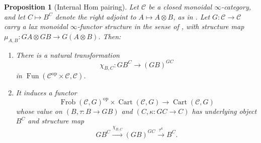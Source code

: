 \documentclass[10pt,a4paper]{amsart}
\newtheorem{proposition}{Proposition}
\newcommand{\Cart}{\operatorname{Cart}}
\newcommand{\Frob}{\operatorname{Frob}}
\DeclareMathOperator{\Fun}{\mathrm{Fun}}
\newcommand{\cC}{\mathcal{C}}
\newcommand{\op}{{\operatorname{op}}}
\begin{document}
\begin{proposition}[Internal Hom pairing]\label{prop:abstract-hom}
Let $\cC$ be a closed monoidal $\infty$-category, and let
$C\mapsto B^C$ denote the right adjoint to $A\mapsto A\otimes B$,
as in \cite[Definition 4.1.1.15; Remark 4.1.1.16]{HA}.
Let $G:\cC\to\cC$ carry a lax monoidal $\infty$-functor structure
in the sense of \cite[Definition 2.1.2.7; Example 2.2.6.10]{HA},
with structure map $\mu_{A,B}:GA\otimes GB\to G(A\otimes B)$.
Then:
\begin{enumerate}
\item
There is a natural transformation
\[
 \chi_{B,C}:G B^C\longrightarrow (GB)^{GC}
\]
in $\Fun(\cC^{\op}\times\cC,\cC)$.
\item
It induces a functor
\[
 \Frob(\cC,G)^{\op}\times\Cart(\cC,G)
       \longrightarrow\Cart(\cC,G)
\]
whose value on $(B,\tau:B\to GB)$ and $(C,\kappa:GC\to C)$
has underlying object $B^C$ and structure map
\begin{equation}\label{eq:abstract-hom-structure}
 G B^C\xrightarrow{\chi_{B,C}}(GB)^{GC}
                \xrightarrow{\tau^\kappa}B^C.
\end{equation}
\end{enumerate}
\end{proposition}
\end{document}
